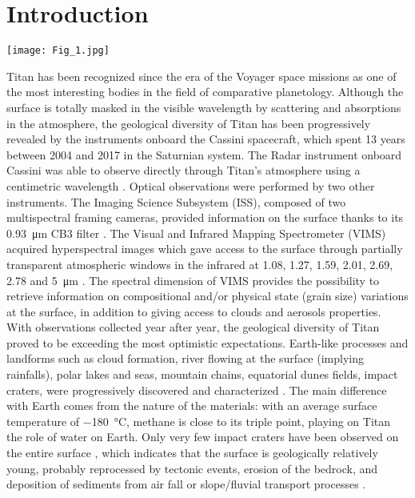 \documentclass[preprint,twocolumn,5p,authoryear,compress,colorlinks=true]{elsarticle}
\begin{document}

\section{Introduction}

\begin{figure*}[!ht]
 \texttt{[image: Fig\_1.jpg]}
 \caption{Pixel size (in km) of the cubes used to build our global mosaic. A global map at \SI{2}{\um} is shown in transparency. The cumulative fractional coverage is shown on the right. Only \SI{5}{\percent} of the surface has been observed with a pixel size better than \SI{6}{km}. \SI{60}{\percent} was observed in conditions better than \SI{15}{km/pixel}.}
 \label{fig:fig_1}
\end{figure*}

Titan has been recognized since the era of the Voyager space missions as one of the most interesting bodies in the field of comparative planetology. Although the surface is totally masked in the visible wavelength by scattering and absorptions in the atmosphere, the geological diversity of Titan has been progressively revealed by the instruments onboard the Cassini spacecraft, which spent 13 years between 2004 and 2017 in the Saturnian system. The Radar instrument onboard Cassini was able to observe directly through Titan's atmosphere using a centimetric wavelength \citep{Elachi2005}. Optical observations were performed by two other instruments. The Imaging Science Subsystem (ISS), composed of two multispectral framing cameras, provided information on the surface thanks to its 0.\SI{93}{\um} CB3 filter \citep{Porco2005}. The Visual and Infrared Mapping Spectrometer (VIMS) acquired hyperspectral images which gave access to the surface through partially transparent atmospheric windows in the infrared at \num{1.08}, \num{1.27}, \num{1.59}, \num{2.01}, \num{2.69}, \num{2.78} and \SI{5}{\um} \citep{Brown2004,Sotin2005}. The spectral dimension of VIMS provides the possibility to retrieve information on compositional and/or physical state (grain size) variations at the surface, in addition to giving access to clouds and aerosols properties. With observations collected year after year, the geological diversity of Titan proved to be exceeding the most optimistic expectations. Earth-like processes and landforms such as cloud formation, river flowing at the surface (implying rainfalls), polar lakes and seas, mountain chains, equatorial dunes fields, impact craters, were progressively discovered and characterized \citep{Tomasko2005,Stofan2007,Radebaugh2007,Radebaugh2008,Wood2010,Aharonson2014}. The main difference with Earth comes from the nature of the materials: with an average surface temperature of \SI{-180}{\degreeCelsius}, methane is close to its triple point, playing on Titan the role of water on Earth. Only very few impact craters have been observed on the entire surface \citep{Wood2010}, which indicates that the surface is geologically relatively young, probably reprocessed by tectonic events, erosion of the bedrock, and deposition of sediments from air fall or slope/fluvial transport processes \citep{Neish2016,Brossier2018}.
\end{document}
